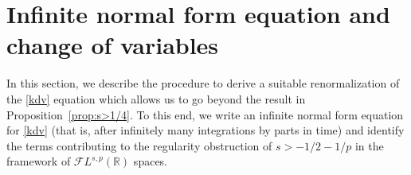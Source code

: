 \documentclass[%
11pt,  reqno]{amsart}
\newcommand{\5}{\textup{V}}
\newcommand{\FL}{\mathcal{F} L}
\theoremstyle{remark}
\newcommand{\R}{\mathbb{R}}
\numberwithin{equation}{section}
\numberwithin{theorem}{section}
\begin{document}
	
	
	
	
	\newpage
	


\section{Infinite normal form equation and change of variables}


In this section, we describe the procedure to derive a suitable renormalization of the \eqref{kdv} equation which allows us to go beyond the result in Proposition~\ref{prop:s>1/4}. 
To this end, we write an infinite normal form equation for \eqref{kdv} (that is, after infinitely
many integrations by parts in time) and 
identify the terms contributing to the regularity obstruction of $s>-1/2-1/p$ in the framework of $\mathcal{F}L^{s,p}(\R)$ spaces. 
\end{document}
